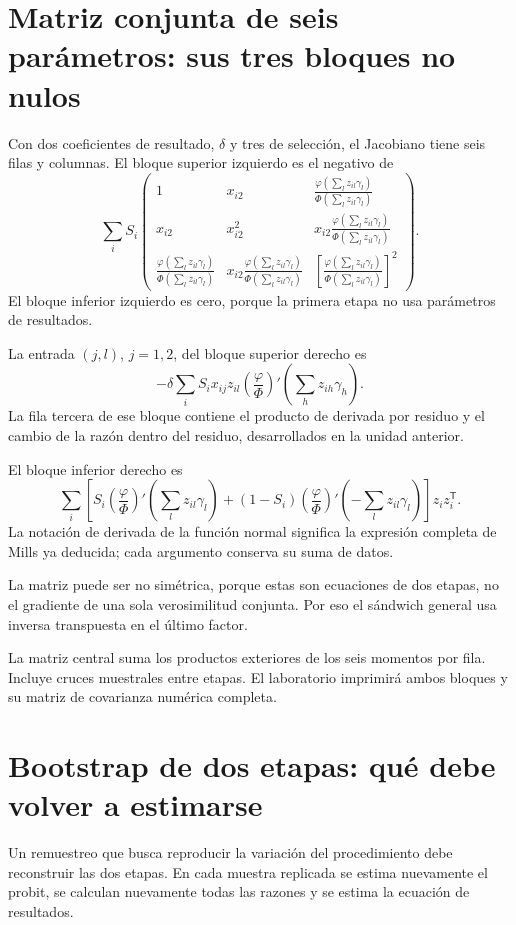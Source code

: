 \documentclass[11pt,a4paper]{article}
\newcommand{\T}{^{\mathsf T}}
\begin{document}
\section{Matriz conjunta de seis parámetros: sus tres bloques no nulos}\label{unidad139}
Con dos coeficientes de resultado, \(\delta\)
y tres de selección, el Jacobiano
tiene seis filas y columnas.
El bloque superior izquierdo es
el negativo de
\[
\sum_iS_i
\begin{pmatrix}
1&x_{i2}&\frac{\varphi(\sum_lz_{il}\gamma_l)}{\Phi(\sum_lz_{il}\gamma_l)}\\
x_{i2}&x_{i2}^2&x_{i2}\frac{\varphi(\sum_lz_{il}\gamma_l)}{\Phi(\sum_lz_{il}\gamma_l)}\\
\frac{\varphi(\sum_lz_{il}\gamma_l)}{\Phi(\sum_lz_{il}\gamma_l)}
&x_{i2}\frac{\varphi(\sum_lz_{il}\gamma_l)}{\Phi(\sum_lz_{il}\gamma_l)}
&\left[\frac{\varphi(\sum_lz_{il}\gamma_l)}{\Phi(\sum_lz_{il}\gamma_l)}\right]^2
\end{pmatrix}.
\]
El bloque inferior izquierdo es cero,
porque la primera etapa no
usa parámetros de resultados.

La entrada \((j,l)\), \(j=1,2\),
del bloque superior derecho es
\[
-\delta\sum_iS_ix_{ij}z_{il}
\left(\frac{\varphi}{\Phi}\right)'
\left(\sum_hz_{ih}\gamma_h\right).
\]
La fila tercera de ese bloque
contiene el producto de derivada
por residuo y el cambio
de la razón dentro del residuo,
desarrollados en la unidad anterior.

El bloque inferior derecho es
\[
\sum_i
\left[
S_i\left(\frac{\varphi}{\Phi}\right)'(\sum_lz_{il}\gamma_l)
+(1-S_i)\left(\frac{\varphi}{\Phi}\right)'(-\sum_lz_{il}\gamma_l)
\right]z_iz_i\T.
\]
La notación de derivada de la
función normal significa la
expresión completa de Mills
ya deducida; cada argumento
conserva su suma de datos.

La matriz puede ser no simétrica,
porque estas son ecuaciones de
dos etapas, no el gradiente
de una sola verosimilitud conjunta.
Por eso el sándwich general
usa inversa transpuesta
en el último factor.

La matriz central suma los
productos exteriores de los
seis momentos por fila.
Incluye cruces muestrales entre etapas.
El laboratorio imprimirá ambos
bloques y su matriz de
covarianza numérica completa.

\clearpage
\section{Bootstrap de dos etapas: qué debe volver a estimarse}\label{unidad140}
Un remuestreo que busca reproducir
la variación del procedimiento
debe reconstruir las dos etapas.
En cada muestra replicada se
estima nuevamente el probit,
se calculan nuevamente todas
las razones y se estima
la ecuación de resultados.
\end{document}
